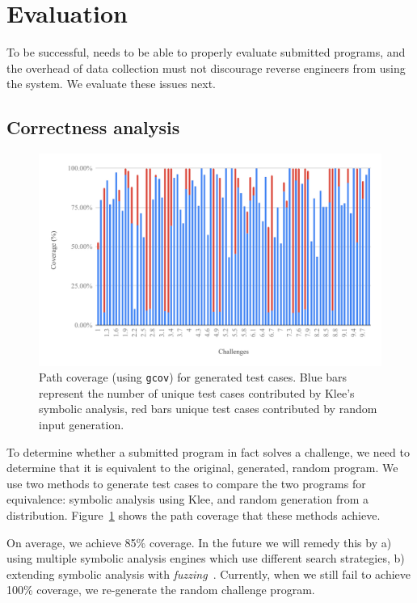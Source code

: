 \section{Evaluation}
\label{evaluation}
To be successful, \revenge needs to be able to properly evaluate submitted programs, and the overhead of data collection must not discourage reverse engineers from using the system. We evaluate these issues next.

\subsection{Correctness analysis}
\begin{figure}[t]
\centering
\includegraphics[width=\columnwidth]{coverage.pdf}
\caption{Path coverage (using {\tt gcov}) for generated test cases. Blue bars represent the number of unique test cases contributed by Klee's symbolic analysis, red bars unique test cases contributed by random input generation.}
\label{fig:coverage}
\end{figure}

To determine whether a submitted program in fact solves a challenge, we need to determine that it is equivalent to the original, generated, random program. We use two methods to generate test cases to compare the two programs for equivalence: symbolic analysis using Klee, and random generation from a distribution. Figure~\ref{fig:coverage} shows the path coverage that these methods achieve. 

On average, we achieve 85\% coverage. In the future we will remedy this by a) using multiple symbolic analysis engines which use different search strategies, b) extending symbolic analysis with {\em fuzzing}~\cite{DBLP:conf/ndss/StephensGSDWCSK16}. Currently, when we still fail to achieve 100\% coverage, we re-generate the random challenge program.

